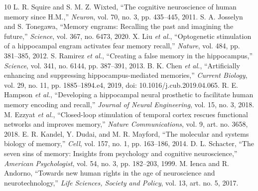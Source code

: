 \documentclass[conference]{IEEEtran}
\begin{document}
\begin{thebibliography}{10}
 L. R. Squire and S. M. Z. Wixted, ``The cognitive neuroscience of human memory since H.M.,'' \textit{Neuron}, vol. 70, no. 3, pp. 435--445, 2011.
 S. A. Josselyn and S. Tonegawa, ``Memory engrams: Recalling the past and imagining the future,'' \textit{Science}, vol. 367, no. 6473, 2020.
 X. Liu \textit{et al.}, ``Optogenetic stimulation of a hippocampal engram activates fear memory recall,'' \textit{Nature}, vol. 484, pp. 381--385, 2012.
 S. Ramirez \textit{et al.}, ``Creating a false memory in the hippocampus,'' \textit{Science}, vol. 341, no. 6144, pp. 387--391, 2013.
 B. K. Chen \textit{et al.}, ``Artificially enhancing and suppressing hippocampus-mediated memories,'' \textit{Current Biology}, vol. 29, no. 11, pp. 1885--1894.e4, 2019, doi: 10.1016/j.cub.2019.04.065.
 R. E. Hampson \textit{et al.}, ``Developing a hippocampal neural prosthetic to facilitate human memory encoding and recall,'' \textit{Journal of Neural Engineering}, vol. 15, no. 3, 2018.
 M. Ezzyat \textit{et al.}, ``Closed-loop stimulation of temporal cortex rescues functional networks and improves memory,'' \textit{Nature Communications}, vol. 9, art. no. 3658, 2018.
 E. R. Kandel, Y. Dudai, and M. R. Mayford, ``The molecular and systems biology of memory,'' \textit{Cell}, vol. 157, no. 1, pp. 163--186, 2014.
 D. L. Schacter, ``The seven sins of memory: Insights from psychology and cognitive neuroscience,'' \textit{American Psychologist}, vol. 54, no. 3, pp. 182--203, 1999.
 M. Ienca and R. Andorno, ``Towards new human rights in the age of neuroscience and neurotechnology,'' \textit{Life Sciences, Society and Policy}, vol. 13, art. no. 5, 2017.
\end{thebibliography}
\end{document}
